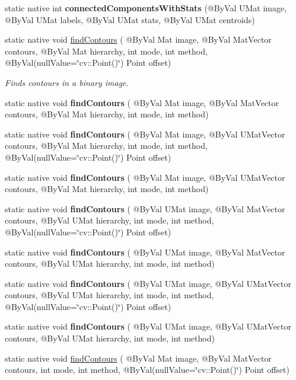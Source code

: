 \begin{DoxyCompactItemize}
\item 
static native int {\bfseries connected\+Components\+With\+Stats} (@By\+Val U\+Mat image, @By\+Val U\+Mat labels, @By\+Val U\+Mat stats, @By\+Val U\+Mat centroids)
\item 
static native void \hyperlink{group__imgproc__shape_gad95c6aa001eb4a24cc898ff08dcb81da}{find\+Contours} ( @By\+Val Mat image, @By\+Val Mat\+Vector contours, @By\+Val Mat hierarchy, int mode, int method, @By\+Val(null\+Value=\char`\"{}cv\+::\+Point()\char`\"{}) Point offset)
\begin{DoxyCompactList}\small\item\em Finds contours in a binary image. \end{DoxyCompactList}\item 
static native void {\bfseries find\+Contours} ( @By\+Val Mat image, @By\+Val Mat\+Vector contours, @By\+Val Mat hierarchy, int mode, int method)
\item 
static native void {\bfseries find\+Contours} ( @By\+Val Mat image, @By\+Val U\+Mat\+Vector contours, @By\+Val Mat hierarchy, int mode, int method, @By\+Val(null\+Value=\char`\"{}cv\+::\+Point()\char`\"{}) Point offset)
\item 
static native void {\bfseries find\+Contours} ( @By\+Val Mat image, @By\+Val U\+Mat\+Vector contours, @By\+Val Mat hierarchy, int mode, int method)
\item 
static native void {\bfseries find\+Contours} ( @By\+Val U\+Mat image, @By\+Val Mat\+Vector contours, @By\+Val U\+Mat hierarchy, int mode, int method, @By\+Val(null\+Value=\char`\"{}cv\+::\+Point()\char`\"{}) Point offset)
\item 
static native void {\bfseries find\+Contours} ( @By\+Val U\+Mat image, @By\+Val Mat\+Vector contours, @By\+Val U\+Mat hierarchy, int mode, int method)
\item 
static native void {\bfseries find\+Contours} ( @By\+Val U\+Mat image, @By\+Val U\+Mat\+Vector contours, @By\+Val U\+Mat hierarchy, int mode, int method, @By\+Val(null\+Value=\char`\"{}cv\+::\+Point()\char`\"{}) Point offset)
\item 
static native void {\bfseries find\+Contours} ( @By\+Val U\+Mat image, @By\+Val U\+Mat\+Vector contours, @By\+Val U\+Mat hierarchy, int mode, int method)
\item 
static native void \hyperlink{group__imgproc__shape_ga9242b107e02badf32d704830cda84585}{find\+Contours} ( @By\+Val Mat image, @By\+Val Mat\+Vector contours, int mode, int method, @By\+Val(null\+Value=\char`\"{}cv\+::\+Point()\char`\"{}) Point offset)

\end{DoxyCompactItemize}
